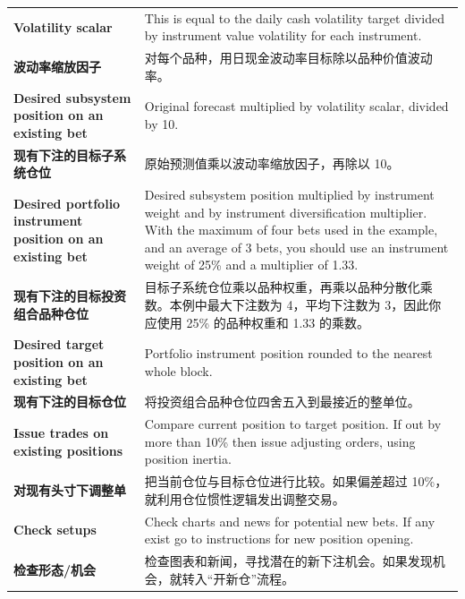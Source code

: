 \begin{bilingualtableblock}
{\begin{tabularx}{\textwidth}{@{} p{} Y@{}}
\textbf{Volatility scalar} & This is equal to the daily cash volatility target divided by instrument value volatility for each instrument. \\
\textbf{波动率缩放因子} & 对每个品种，用日现金波动率目标除以品种价值波动率。 \\
\textbf{Desired subsystem position on an existing bet} & Original forecast multiplied by volatility scalar, divided by 10. \\
\textbf{现有下注的目标子系统仓位} & 原始预测值乘以波动率缩放因子，再除以 10。 \\
\textbf{Desired portfolio instrument position on an existing bet} & Desired subsystem position multiplied by instrument weight and by instrument diversification multiplier. With the maximum of four bets used in the example, and an average of 3 bets, you should use an instrument weight of 25\% and a multiplier of 1.33. \\
\textbf{现有下注的目标投资组合品种仓位} & 目标子系统仓位乘以品种权重，再乘以品种分散化乘数。本例中最大下注数为 4，平均下注数为 3，因此你应使用 25\% 的品种权重和 1.33 的乘数。 \\
\textbf{Desired target position on an existing bet} & Portfolio instrument position rounded to the nearest whole block. \\
\textbf{现有下注的目标仓位} & 将投资组合品种仓位四舍五入到最接近的整单位。 \\
\textbf{Issue trades on existing positions} & Compare current position to target position. If out by more than 10\% then issue adjusting orders, using position inertia. \\
\textbf{对现有头寸下调整单} & 把当前仓位与目标仓位进行比较。如果偏差超过 10\%，就利用仓位惯性逻辑发出调整交易。 \\
\textbf{Check setups} & Check charts and news for potential new bets. If any exist go to instructions for new position opening. \\
\textbf{检查形态/机会} & 检查图表和新闻，寻找潜在的新下注机会。如果发现机会，就转入“开新仓”流程。 \\
\end{tabularx}
}
\end{bilingualtableblock}


